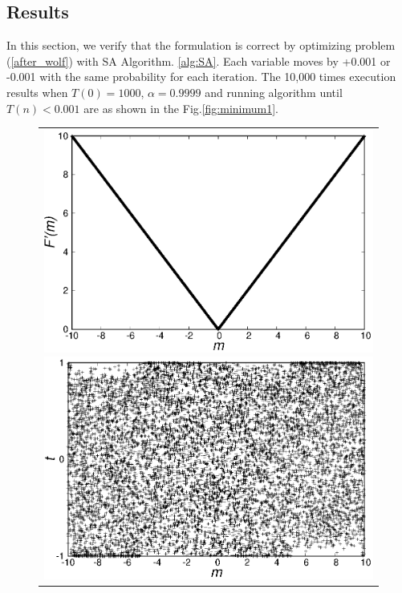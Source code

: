 \documentclass[fp,twocolumn]{jpsj3}
\begin{document}
\subsection{Results} \label{experiment_condition} %
In this section, we verify that the formulation is correct by optimizing problem (\ref{after_wolf}) with SA Algorithm. \ref{alg:SA}. Each variable moves by +0.001 or -0.001 with the same probability for each iteration. The 10,000 times execution results when $T(0)=1000$, $\alpha=0.9999$ and running algorithm until $T(n)<0.001$ are as shown in the Fig.\ref{fig:minimum1}.

\begin{figure}[htbp]
  \begin{center}
    \begin{tabular}{c}
      \begin{minipage}{0.50\hsize}
        \centering
        \includegraphics[keepaspectratio,scale=0.33]{minimum_cost.eps}
      \end{minipage}
      \begin{minipage}{0.50\hsize}
        \centering
        \includegraphics[keepaspectratio,scale=0.33]{minimum_t.eps}

\end{minipage}
\end{tabular}
\end{center}
\end{figure}
\end{document}
